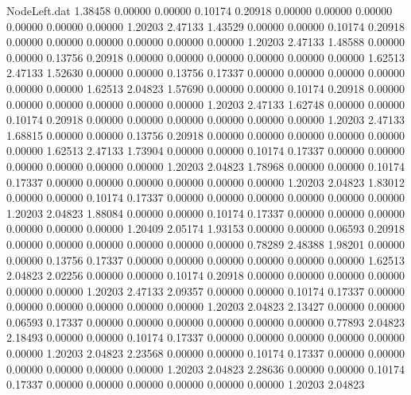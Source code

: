 \begin{filecontents}{NodeLeft.dat}
   1.38458    0.00000    0.00000     0.10174    0.20918    0.00000    0.00000    0.00000    0.00000    0.00000    0.00000    1.20203    2.47133
   1.43529    0.00000    0.00000     0.10174    0.20918    0.00000    0.00000    0.00000    0.00000    0.00000    0.00000    1.20203    2.47133
   1.48588    0.00000    0.00000     0.13756    0.20918    0.00000    0.00000    0.00000    0.00000    0.00000    0.00000    1.62513    2.47133
   1.52630    0.00000    0.00000     0.13756    0.17337    0.00000    0.00000    0.00000    0.00000    0.00000    0.00000    1.62513    2.04823
   1.57690    0.00000    0.00000     0.10174    0.20918    0.00000    0.00000    0.00000    0.00000    0.00000    0.00000    1.20203    2.47133
   1.62748    0.00000    0.00000     0.10174    0.20918    0.00000    0.00000    0.00000    0.00000    0.00000    0.00000    1.20203    2.47133
   1.68815    0.00000    0.00000     0.13756    0.20918    0.00000    0.00000    0.00000    0.00000    0.00000    0.00000    1.62513    2.47133
   1.73904    0.00000    0.00000     0.10174    0.17337    0.00000    0.00000    0.00000    0.00000    0.00000    0.00000    1.20203    2.04823
   1.78968    0.00000    0.00000     0.10174    0.17337    0.00000    0.00000    0.00000    0.00000    0.00000    0.00000    1.20203    2.04823
   1.83012    0.00000    0.00000     0.10174    0.17337    0.00000    0.00000    0.00000    0.00000    0.00000    0.00000    1.20203    2.04823
   1.88084    0.00000    0.00000     0.10174    0.17337    0.00000    0.00000    0.00000    0.00000    0.00000    0.00000    1.20409    2.05174
   1.93153    0.00000    0.00000     0.06593    0.20918    0.00000    0.00000    0.00000    0.00000    0.00000    0.00000    0.78289    2.48388
   1.98201    0.00000    0.00000     0.13756    0.17337    0.00000    0.00000    0.00000    0.00000    0.00000    0.00000    1.62513    2.04823
   2.02256    0.00000    0.00000     0.10174    0.20918    0.00000    0.00000    0.00000    0.00000    0.00000    0.00000    1.20203    2.47133
   2.09357    0.00000    0.00000     0.10174    0.17337    0.00000    0.00000    0.00000    0.00000    0.00000    0.00000    1.20203    2.04823
   2.13427    0.00000    0.00000     0.06593    0.17337    0.00000    0.00000    0.00000    0.00000    0.00000    0.00000    0.77893    2.04823
   2.18493    0.00000    0.00000     0.10174    0.17337    0.00000    0.00000    0.00000    0.00000    0.00000    0.00000    1.20203    2.04823
   2.23568    0.00000    0.00000     0.10174    0.17337    0.00000    0.00000    0.00000    0.00000    0.00000    0.00000    1.20203    2.04823
   2.28636    0.00000    0.00000     0.10174    0.17337    0.00000    0.00000    0.00000    0.00000    0.00000    0.00000    1.20203    2.04823

\end{filecontents}

